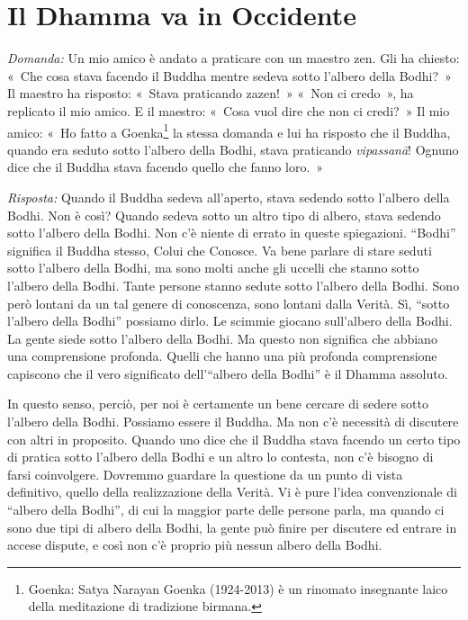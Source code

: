 \chapter{Il Dhamma va in Occidente}

\emph{Domanda:} Un mio amico è andato a praticare con un maestro zen. Gli ha
chiesto: «~Che cosa stava facendo il Buddha mentre sedeva sotto l'albero
della Bodhi?~» Il maestro ha risposto: «~Stava praticando zazen!~» «~Non
ci credo~», ha replicato il mio amico. E il maestro: «~Cosa vuol dire
che non ci credi?~» Il mio amico: «~Ho fatto a Goenka\footnote{Goenka:
  Satya Narayan Goenka (1924-2013) è un rinomato insegnante laico della
  meditazione di tradizione birmana.} la stessa domanda e lui ha
risposto che il Buddha, quando era seduto sotto l'albero della Bodhi,
stava praticando \emph{vipassanā}! Ognuno dice che il Buddha stava
facendo quello che fanno loro.~»

\emph{Risposta:} Quando il Buddha sedeva all'aperto, stava sedendo sotto
l'albero della Bodhi. Non è così? Quando sedeva sotto un altro tipo di
albero, stava sedendo sotto l'albero della Bodhi. Non c'è niente di
errato in queste spiegazioni. ``Bodhi'' significa il Buddha stesso,
Colui che Conosce. Va bene parlare di stare seduti sotto l'albero della
Bodhi, ma sono molti anche gli uccelli che stanno sotto l'albero della
Bodhi. Tante persone stanno sedute sotto l'albero della Bodhi. Sono però
lontani da un tal genere di conoscenza, sono lontani dalla Verità. Sì,
``sotto l'albero della Bodhi'' possiamo dirlo. Le scimmie giocano
sull'albero della Bodhi. La gente siede sotto l'albero della Bodhi. Ma
questo non significa che abbiano una comprensione profonda. Quelli che
hanno una più profonda comprensione capiscono che il vero significato
dell'``albero della Bodhi'' è il Dhamma assoluto.

In questo senso, perciò, per noi è certamente un bene cercare di sedere
sotto l'albero della Bodhi. Possiamo essere il Buddha. Ma non c'è
necessità di discutere con altri in proposito. Quando uno dice che il
Buddha stava facendo un certo tipo di pratica sotto l'albero della Bodhi
e un altro lo contesta, non c'è bisogno di farsi coinvolgere. Dovremmo
guardare la questione da un punto di vista definitivo, quello della
realizzazione della Verità. Vi è pure l'idea convenzionale di ``albero
della Bodhi'', di cui la maggior parte delle persone parla, ma quando ci
sono due tipi di albero della Bodhi, la gente può finire per discutere
ed entrare in accese dispute, e così non c'è proprio più nessun albero
della Bodhi.

